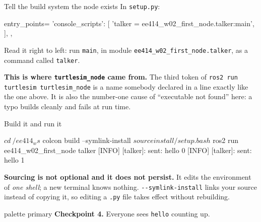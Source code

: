 \documentclass[aspectratio=169]{beamer}
\begin{document}
\begin{frame}[fragile]{Tell the build system the node exists}
  \small In \texttt{setup.py}:

  \begin{pycodes}
entry_points={
    'console_scripts': [
        'talker = ee414_w02_first_node.talker:main',
    ],
},
  \end{pycodes}

  \footnotesize
  Read it right to left: run \texttt{main}, in module
  \texttt{ee414\_w02\_first\_node.talker}, as a command called \texttt{talker}.

  \begin{inthefield}
    \footnotesize
    \textbf{This is where \texttt{turtlesim\_node} came from.} The third token of
    \texttt{ros2 run turtlesim turtlesim\_node} is a name somebody declared in a line exactly
    like the one above. It is also the number-one cause of ``executable not found'' here: a
    typo builds cleanly and fails at run time.
  \end{inthefield}
\end{frame}

\begin{frame}[fragile]{Build it and run it}
  \begin{shells}
$ cd ~/ee414_ws
$ colcon build --symlink-install
$ source install/setup.bash
$ ros2 run ee414_w02_first_node talker
[INFO] [talker]: sent: hello 0
[INFO] [talker]: sent: hello 1
  \end{shells}

  \vspace{0.4em}
  \small
  \textbf{Sourcing is not optional and it does not persist.} It edits the environment of
  \emph{one shell}; a new terminal knows nothing. \texttt{-{}-symlink-install} links your
  source instead of copying it, so editing a \texttt{.py} file takes effect without rebuilding.

  \vspace{0.3em}
  \centering
  \begin{beamercolorbox}[sep=5pt,center,rounded=true]{palette primary}
    \footnotesize \textbf{Checkpoint 4.} Everyone sees \texttt{hello} counting up.
  \end{beamercolorbox}
\end{frame}
\end{document}
